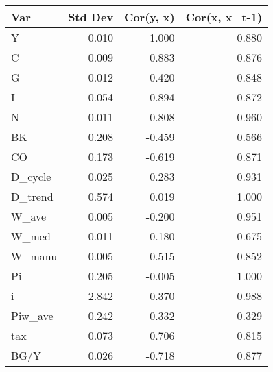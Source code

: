 \begin{tabular}{lrrr}
\toprule
Var & Std Dev & Cor(y, x) & Cor(x, x_t-1) \\
\midrule
Y & 0.010 & 1.000 & 0.880 \\
C & 0.009 & 0.883 & 0.876 \\
G & 0.012 & -0.420 & 0.848 \\
I & 0.054 & 0.894 & 0.872 \\
N & 0.011 & 0.808 & 0.960 \\
BK & 0.208 & -0.459 & 0.566 \\
CO & 0.173 & -0.619 & 0.871 \\
D_cycle & 0.025 & 0.283 & 0.931 \\
D_trend & 0.574 & 0.019 & 1.000 \\
W_ave & 0.005 & -0.200 & 0.951 \\
W_med & 0.011 & -0.180 & 0.675 \\
W_manu & 0.005 & -0.515 & 0.852 \\
Pi & 0.205 & -0.005 & 1.000 \\
i & 2.842 & 0.370 & 0.988 \\
Piw_ave & 0.242 & 0.332 & 0.329 \\
tax & 0.073 & 0.706 & 0.815 \\
BG/Y & 0.026 & -0.718 & 0.877 \\
\bottomrule
\end{tabular}

